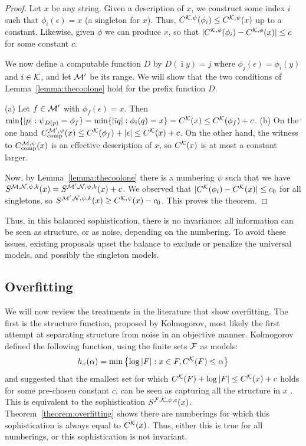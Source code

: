 \begin{proof}
Let $x$ be any string. Given a description of $x$, we construct some index $i$ such that $\phi_i(\epsilon) = x$ (a singleton for $x$). Thus, $C^{{\cal K}, \psi}(\phi_i) \leq C^{{\cal K},\psi}(x)$ up to a constant. Likewise, given $\phi$ we can produce $x$, so that $|C^{{\cal K},\phi}(\phi_i)-C^{{\cal K}, \phi}(x)|\le c$ for some constant $c$. 

We now define a computable function $D$ by $D(\bar\imath y)=j$ where $\phi_j(\epsilon) = \phi_i(y)$ and $i \in {\cal K}$, and let ${\cal M}'$ be its range.  We will show that the two conditions of Lemma~\ref{lemma:thecoolone} hold for the prefix function $D$.

(a) Let $f \in {\cal M}'$ with $\phi_f(\epsilon) = x$. Then $\min\{|p|:\psi_{D(p)}=\phi_f\}=\min\{|\bar\imath q|:\phi_i(q)=x\}=C^{{\cal K}}(x) \le C^{{\cal K}}(\phi_f)+c$. (b) On the one hand $C_{\textnormal{comp}}^{{\cal M}',\psi}(x)\le C^{\cal K}(\phi_f)+|\epsilon|\le C^{\cal K}(x)+c$. On the other hand, the witness to $C_{\textnormal{comp}}^{{\cal M},\psi}(x)$ is an effective description of $x$, so $C^{{\cal K}}(x)$ is at most a constant larger. 

Now, by Lemma~\ref{lemma:thecoolone} there is a numbering $\psi$ such that we have $S^{{\cal M},{\cal N},\psi,k}(x) =S^{{\cal M}',{\cal N},\psi,k}(x) + c$. We observed that $|C^{{\cal K}}(\phi_i)-C^{{\cal K}}(x)|\le c_0$ for all singletons, so $S^{{\cal M}',{\cal N},\psi, k}(x)\ge C^{{\cal K},\psi}(x)-c_0$. This proves the theorem.
\end{proof}

\noindent Thus, in this balanced sophistication, there is no invariance: all information can be seen as structure, or as noise, depending on the numbering. To avoid these issues, existing proposals upset the balance to exclude or penalize the universal models, and possibly the singleton models. 

\subsection{Overfitting}

We will now review the treatments in the literature that show overfitting. The first is the structure function, proposed by Kolmogorov, most likely the first attempt at separating structure from noise in an objective manner. Kolmogorov defined the following function, using the finite sets ${\cal F}$ as models:
\[
h_x(\alpha) = \min \left \{\log |F| : x \in F, C^{\cal K}(F) \leq \alpha \right \} 
\]
and suggested that the smallest set for which $C^{\cal K}(F) + \log|F| \leq C^{\cal K}(x) + c$ holds for some pre-chosen constant $c$, can be seen as capturing all the structure in $x$ \cite{cover1985kolmogorov}. This is equivalent to the sophistication $S^{{\cal F},{\cal K},\psi,c}(x)$. Theorem~\ref{theorem:overfitting} shows there are numberings for which this sophistication is always equal to $C^{\cal K}(x)$. Thus, either this is true for all numberings, or this sophistication is not invariant.
 
